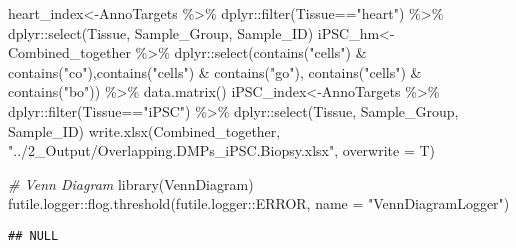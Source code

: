 \documentclass[
  10pt,
]{article}
\newenvironment{Shaded}{\begin{snugshade}}{\end{snugshade}}
\newcommand{\AttributeTok}[1]{\textcolor[rgb]{0.77,0.63,0.00}{#1}}
\newcommand{\CommentTok}[1]{\textcolor[rgb]{0.56,0.35,0.01}{\textit{#1}}}
\newcommand{\FloatTok}[1]{\textcolor[rgb]{0.00,0.00,0.81}{#1}}
\newcommand{\FunctionTok}[1]{\textcolor[rgb]{0.00,0.00,0.00}{#1}}
\newcommand{\NormalTok}[1]{#1}
\newcommand{\OtherTok}[1]{\textcolor[rgb]{0.56,0.35,0.01}{#1}}
\newcommand{\SpecialCharTok}[1]{\textcolor[rgb]{0.00,0.00,0.00}{#1}}
\newcommand{\StringTok}[1]{\textcolor[rgb]{0.31,0.60,0.02}{#1}}
\begin{document}
\begin{Shaded}
\begin{Highlighting}[]
\NormalTok{heart\_index}\OtherTok{\textless{}{-}}\NormalTok{AnnoTargets }\SpecialCharTok{\%\textgreater{}\%}\NormalTok{ dplyr}\SpecialCharTok{::}\FunctionTok{filter}\NormalTok{(Tissue}\SpecialCharTok{==}\StringTok{"heart"}\NormalTok{) }\SpecialCharTok{\%\textgreater{}\%}\NormalTok{ dplyr}\SpecialCharTok{::}\FunctionTok{select}\NormalTok{(Tissue, Sample\_Group, Sample\_ID)}
\NormalTok{iPSC\_hm}\OtherTok{\textless{}{-}}\NormalTok{Combined\_together }\SpecialCharTok{\%\textgreater{}\%}\NormalTok{ dplyr}\SpecialCharTok{::}\FunctionTok{select}\NormalTok{(}\FunctionTok{contains}\NormalTok{(}\StringTok{"cells"}\NormalTok{) }\SpecialCharTok{\&} \FunctionTok{contains}\NormalTok{(}\StringTok{"co"}\NormalTok{),}\FunctionTok{contains}\NormalTok{(}\StringTok{"cells"}\NormalTok{) }\SpecialCharTok{\&} \FunctionTok{contains}\NormalTok{(}\StringTok{"go"}\NormalTok{), }\FunctionTok{contains}\NormalTok{(}\StringTok{"cells"}\NormalTok{) }\SpecialCharTok{\&} \FunctionTok{contains}\NormalTok{(}\StringTok{"bo"}\NormalTok{)) }\SpecialCharTok{\%\textgreater{}\%} \FunctionTok{data.matrix}\NormalTok{()}
\NormalTok{iPSC\_index}\OtherTok{\textless{}{-}}\NormalTok{AnnoTargets }\SpecialCharTok{\%\textgreater{}\%}\NormalTok{ dplyr}\SpecialCharTok{::}\FunctionTok{filter}\NormalTok{(Tissue}\SpecialCharTok{==}\StringTok{"iPSC"}\NormalTok{) }\SpecialCharTok{\%\textgreater{}\%}\NormalTok{ dplyr}\SpecialCharTok{::}\FunctionTok{select}\NormalTok{(Tissue, Sample\_Group, Sample\_ID)}
\FunctionTok{write.xlsx}\NormalTok{(Combined\_together, }\StringTok{"../2\_Output/Overlapping.DMPs\_iPSC.Biopsy.xlsx"}\NormalTok{, }\AttributeTok{overwrite =}\NormalTok{ T)}

\CommentTok{\# Venn Diagram}
\FunctionTok{library}\NormalTok{(VennDiagram)}
\NormalTok{futile.logger}\SpecialCharTok{::}\FunctionTok{flog.threshold}\NormalTok{(futile.logger}\SpecialCharTok{::}\NormalTok{ERROR, }\AttributeTok{name =} \StringTok{"VennDiagramLogger"}\NormalTok{)}
\end{Highlighting}
\end{Shaded}

\begin{verbatim}
## NULL
\end{verbatim}

\begin{Shaded}
\end{Shaded}
\end{document}
